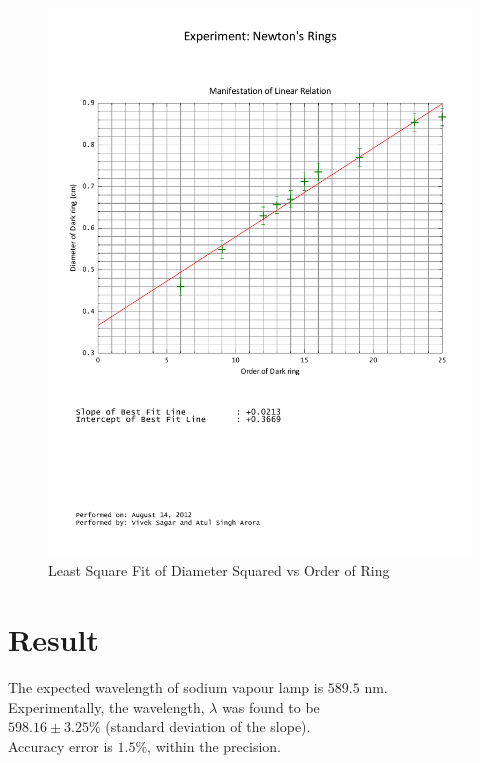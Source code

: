	\begin{figure}[bth]
		\begin{center}
			\includegraphics[width=1.3\linewidth]{gfx/1_linear.pdf}
		\end{center}
	\caption[Diameter Squared vs Order of Ring]{Least Square Fit of Diameter Squared vs Order of Ring}
	\label{1_graph}
	\end{figure}

\section{Result}
	The expected wavelength of sodium vapour lamp is $589.5$ nm. \\
	Experimentally, the wavelength, $\lambda$ was found to be \\
	$598.16\pm 3.25\%$ (standard deviation of the slope).\\
	Accuracy error is $1.5\%$, within the precision.
